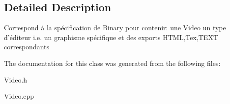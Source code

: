 \subsection{\-Detailed \-Description}
\-Correspond à la spécification de \hyperlink{classBinary}{\-Binary} pour contenir\-: une \hyperlink{classVideo}{\-Video} un type d'éditeur i.\-e. un graphisme spécifique et des exports \-H\-T\-M\-L,\-Tex,\-T\-E\-X\-T correspondants 

\-The documentation for this class was generated from the following files\-:\begin{DoxyCompactItemize}
\item 
\-Video.\-h\item 
\-Video.\-cpp\end{DoxyCompactItemize}
